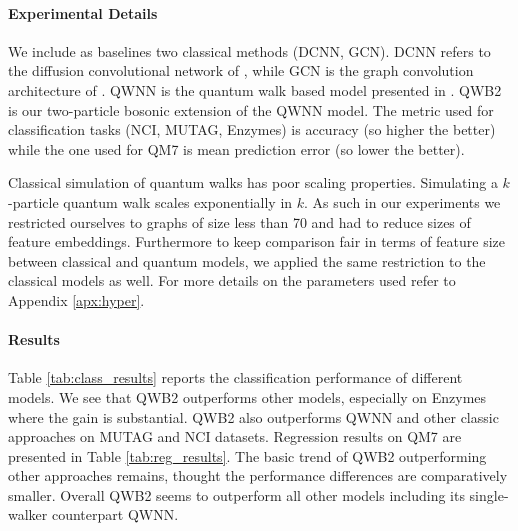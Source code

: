 \documentclass{article}
\begin{document}


\paragraph{Experimental Details}
We include as baselines two classical methods (DCNN, GCN). DCNN refers to the diffusion convolutional network of \citet{Atwood2016DiffusionConvolutionalNN}, while GCN is the graph convolution architecture of \citet{Kipf2017SemiSupervisedCW}.
QWNN is the quantum walk based model presented in \cite{Dernbach19_qwnn}. QWB2 is our two-particle bosonic extension of the QWNN model. The metric used for classification tasks (NCI, MUTAG, Enzymes) is accuracy (so higher the better) while the one used for QM7 is mean prediction error (so lower the better).

Classical simulation of quantum walks has poor scaling properties. Simulating a $k$-particle quantum walk scales exponentially in $k$. As such in our experiments we restricted ourselves to graphs of size less than 70 and had to reduce sizes of feature embeddings. Furthermore to keep comparison fair in terms of feature size between classical and quantum models, we applied the same restriction to the classical models as well. For more details on the parameters used refer to Appendix \ref{apx:hyper}.

\paragraph {Results}
Table \ref{tab:class_results} reports the classification performance of different models. We see that QWB2 outperforms other models, especially on Enzymes where the gain is substantial. QWB2 also outperforms QWNN and other classic approaches on MUTAG and NCI datasets.
Regression results on QM7 are presented in Table \ref{tab:reg_results}. The basic trend of QWB2 outperforming other approaches remains, thought the performance differences are comparatively smaller. 
Overall QWB2 seems to outperform all other models including its single-walker counterpart QWNN.
\end{document}
